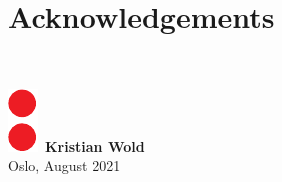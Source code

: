 \chapter*{Acknowledgements}
\thispagestyle{plain}

 
\\ [8 pt]

\begin{flushright}
\includegraphics[height = 1.5ex]{latex-report/3_Images/Logo/UiO/uio-colon.pdf}\, \textbf{Kristian Wold}
\\
Oslo, August 2021
\end{flushright}
